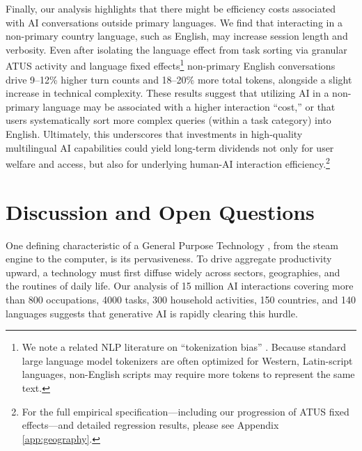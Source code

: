 \documentclass[11pt,a4paper]{article}
\begin{document}
Finally, our analysis highlights that there might be efficiency costs associated with AI conversations outside primary languages. We find that interacting in a non-primary country language, such as English, may increase session length and verbosity. Even after isolating the language effect from task sorting via granular ATUS activity and language fixed effects\footnote{We note a related NLP literature on ``tokenization bias'' \citep{Lundin2026,ahia2023languagescostsametokenization}. Because standard large language model tokenizers are often optimized for Western, Latin-script languages, non-English scripts may require more tokens to represent the same text.} non-primary English conversations drive 9–12\% higher turn counts and 18–20\% more total tokens, alongside a slight increase in technical complexity. These results suggest that utilizing AI in a non-primary language may be associated with a higher interaction ``cost,'' or that users systematically sort more complex queries (within a task category) into English. Ultimately, this underscores that investments in high-quality multilingual AI capabilities \citep[e.g.,][]{bjorkegren2025aileapfrogwebevidence, baroplevine2026afrigpt} could yield long-term dividends not only for user welfare and access, but also for underlying human-AI interaction efficiency.\footnote{For the full empirical specification—including our progression of ATUS fixed effects—and detailed regression results, please see Appendix \ref{app:geography}.}

\section{Discussion and Open Questions}\label{sec:discussion}

One defining characteristic of a General Purpose Technology \citep{Lipsey2005, NBERw4148}, from the steam engine to the computer, is its pervasiveness. To drive aggregate productivity upward, a technology must first diffuse widely across sectors, geographies, and the routines of daily life. Our analysis of 15 million AI interactions covering more than 800 occupations, 4000 tasks, 300 household activities, 150 countries, and 140 languages suggests that generative AI is rapidly clearing this hurdle.
\end{document}
